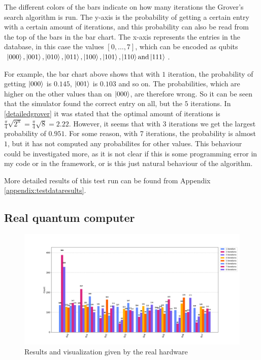 \documentclass[english,oneside,openright]{UH_DS_report}
\begin{document}
The different colors of the bars indicate on how many iterations the Grover's search algorithm is run. The y-axis is the probability of getting a certain entry with a certain amount of iterations, and this probability can also be read from the top of the bars in the bar chart. The x-axis represents the entries in the database, in this case the values $[0,\ldots,7]$, which can be encoded as qubits $\ket{000}, \ket{001}, \ket{010}, \ket{011}, \ket{100}, \ket{101}, \ket{110} \text{and} \ket{111}$.

For example, the bar chart above shows that with $1$ iteration, the probability of getting $\ket{000}$ is $0.145$, $\ket{001}$ is $0.103$ and so on. The probabilities, which are higher on the other values than on $\ket{000}$, are therefore wrong. So it can be seen that the simulator found the correct entry on all, but the $5$ iterations. In \ref{detailedgrover} it was stated that the optimal amount of iterations is $\frac{\pi}{4} \sqrt{2^{n}} = \frac{\pi}{4} \sqrt{8} = 2.22 $. However, it seems that with $3$ iterations we get the largest probability of $0.951$. For some reason, with 7 iterations, the probability is almost $1$, but it has not computed any probabilites for other values. This behaviour could be investigated more, as it is not clear if this is some programming error in my code or in the framework, or is this just natural behaviour of the algorithm.

 More detailed results of this test run can be found from Appendix \ref{appendix:testdataresults}.

\subsection{Real quantum computer}

\begin{figure}[h]
\caption{Results and visualization given by the real hardware}
\centering
\includegraphics[width=\linewidth]{images/hardware/Figure_1_qc.png}
\end{figure}
\end{document}
